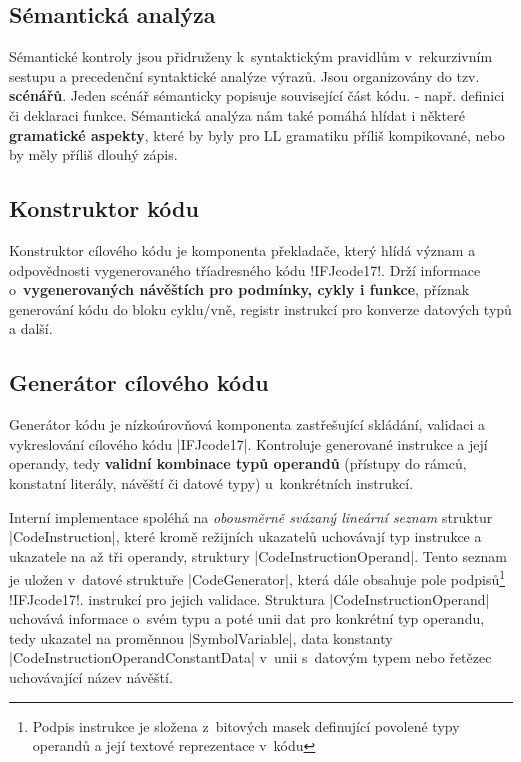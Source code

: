 \subsection{Sémantická analýza}
Sémantické kontroly jsou přidruženy k~syntaktickým pravidlům v~rekurzivním sestupu a
precedenční syntaktické analýze výrazů. Jsou organizovány do tzv. \textbf{scénářů}. Jeden scénář
sémanticky popisuje související část kódu. - např. definici
či deklaraci funkce. Sémantická analýza nám také pomáhá hlídat i některé \textbf{gramatické aspekty},
které by byly pro LL gramatiku příliš kompikované, nebo by měly příliš dlouhý zápis.

\subsection{Konstruktor kódu}
\label{subsec:code-constructor}
Konstruktor cílového kódu je komponenta překladače, který hlídá význam a odpovědnosti vygenerovaného tříadresného kódu \ic!IFJcode17!. Drží informace o~\textbf{vygenerovaných návěštích pro podmínky, cykly i funkce}, příznak generování kódu do bloku cyklu/vně, registr instrukcí pro konverze datových typů a další.

\subsection{Generátor cílového kódu}
Generátor kódu je nízkoúrovňová komponenta zastřešující skládání, validaci a vykreslování cílového kódu \ic|IFJcode17|.
Kontroluje generované instrukce a její operandy, tedy \textbf{validní kombinace typů operandů} (přístupy do rámců, konstatní
literály, návěští či datové typy) u~konkrétních instrukcí.

Interní implementace spoléhá na \emph{obousměrně svázaný lineární seznam} struktur \ic|CodeInstruction|, které kromě
režijních ukazatelů uchovávají typ instrukce a ukazatele na až tři operandy, struktury \ic|CodeInstructionOperand|.
Tento seznam je uložen v~datové struktuře \ic|CodeGenerator|, která dále obsahuje pole podpisů\footnote{Podpis
instrukce je složena z~bitových masek definující povolené typy operandů a její textové reprezentace v~kódu} \ic!IFJcode17!. instrukcí pro jejich validace.
Struktura \ic|CodeInstructionOperand| uchovává informace o~svém typu a poté unii dat pro konkrétní typ operandu, tedy
ukazatel na proměnnou \ic|SymbolVariable|,
data konstanty \ic|CodeInstructionOperandConstantData| v~unii s~datovým typem nebo řetězec uchovávající název návěští.

